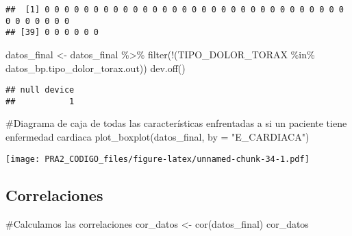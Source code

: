 \documentclass[
]{article}
\newenvironment{Shaded}{\begin{snugshade}}{\end{snugshade}}
\newcommand{\AttributeTok}[1]{\textcolor[rgb]{0.80,0.80,0.80}{#1}}
\newcommand{\CommentTok}[1]{\textcolor[rgb]{0.50,0.62,0.50}{#1}}
\newcommand{\FunctionTok}[1]{\textcolor[rgb]{0.94,0.94,0.56}{#1}}
\newcommand{\NormalTok}[1]{\textcolor[rgb]{0.80,0.80,0.80}{#1}}
\newcommand{\OtherTok}[1]{\textcolor[rgb]{0.94,0.94,0.56}{#1}}
\newcommand{\SpecialCharTok}[1]{\textcolor[rgb]{0.86,0.64,0.64}{#1}}
\newcommand{\StringTok}[1]{\textcolor[rgb]{0.80,0.58,0.58}{#1}}
\begin{document}
\begin{verbatim}
##  [1] 0 0 0 0 0 0 0 0 0 0 0 0 0 0 0 0 0 0 0 0 0 0 0 0 0 0 0 0 0 0 0 0 0 0 0 0 0 0
## [39] 0 0 0 0 0 0
\end{verbatim}

\begin{Shaded}
\begin{Highlighting}[]
\NormalTok{datos\_final }\OtherTok{\textless{}{-}}\NormalTok{ datos\_final }\SpecialCharTok{\%\textgreater{}\%} \FunctionTok{filter}\NormalTok{(}\SpecialCharTok{!}\NormalTok{(TIPO\_DOLOR\_TORAX }\SpecialCharTok{\%in\%}\NormalTok{ datos\_bp.tipo\_dolor\_torax.out))}
\FunctionTok{dev.off}\NormalTok{()}
\end{Highlighting}
\end{Shaded}

\begin{verbatim}
## null device 
##           1
\end{verbatim}

\begin{Shaded}
\begin{Highlighting}[]
\CommentTok{\#Diagrama de caja de todas las características enfrentadas a si un paciente tiene enfermedad cardiaca}
\FunctionTok{plot\_boxplot}\NormalTok{(datos\_final, }\AttributeTok{by =} \StringTok{"E\_CARDIACA"}\NormalTok{)}
\end{Highlighting}
\end{Shaded}

\texttt{[image: PRA2\_CODIGO\_files/figure-latex/unnamed-chunk-34-1.pdf]}

\hypertarget{correlaciones}{%
\subsection{Correlaciones}\label{correlaciones}}

\begin{Shaded}
\begin{Highlighting}[]
\CommentTok{\#Calculamos las correlaciones}
\NormalTok{cor\_datos }\OtherTok{\textless{}{-}} \FunctionTok{cor}\NormalTok{(datos\_final)}
\NormalTok{cor\_datos}
\end{Highlighting}
\end{Shaded}
\end{document}
